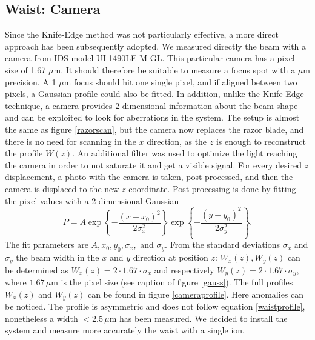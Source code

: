 \subsection{Waist: Camera}
\label{waistcamera}
Since the Knife-Edge method was not particularly effective, a more direct approach has been subsequently adopted. We measured directly the beam with a camera from IDS model UI-1490LE-M-GL. This particular camera has a pixel size of 1.67 $\mu$m. It should therefore be suitable to measure a focus spot with a $\mu$m precision. A 1 $\mu$m focus should hit one single pixel, and if aligned between two pixels, a Gaussian profile could also be fitted.
In addition, unlike the Knife-Edge technique, a camera provides 2-dimensional information about the beam shape and can be exploited to look for aberrations in the system. The setup is almost the same as figure \ref{razorscan}, but the camera now replaces the razor blade, and there is no need for scanning in the $x$ direction, as the $z$ is enough to reconstruct the profile $W(z)$. An additional filter was used to optimize the light reaching the camera in order to not saturate it and get a visible signal.
%
For every desired $z$ displacement, a photo with the camera is taken, post processed, and then the camera is displaced to the new $z$ coordinate. Post processing is done by fitting the pixel values with a 2-dimensional Gaussian
\begin{equation}
P = A \exp\left\{-\frac{(x-x_0)^2}{2\sigma_x^2}\right\} \exp\left\{-\frac{(y-y_0)^2}{2\sigma_y^2} \right\}.
\end{equation}
The fit parameters are $A,x_0,y_0,\sigma_x,$ and $\sigma_y$. From the standard deviations $\sigma_x$ and $\sigma_y$ the beam width in the $x$ and $y$ direction at position $z$: $W_x(z),W_y(z)$ can be determined as $W_x(z) = 2\cdot 1.67\cdot \sigma_x$ and respectively $W_y(z) = 2\cdot 1.67\cdot \sigma_y$, where $1.67\,\mu$m is the pixel size (see caption of figure \ref{gauss}). The full profiles $W_x(z)$ and $W_{y}(z)$ can be found in figure \ref{cameraprofile}. Here anomalies can be noticed. The profile is asymmetric and does not follow equation \ref{waistprofile}, nonetheless a width $<2.5\,\mu$m has been measured. We decided to install the system and measure more accurately the waist with a single ion.
